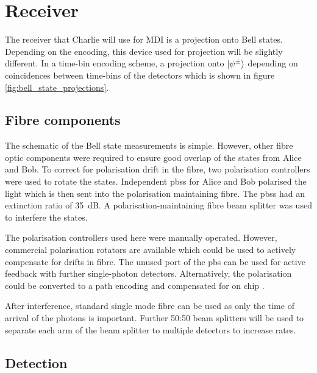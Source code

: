 \section{Receiver}

The receiver that Charlie will use for \ac{MDI} is a projection onto Bell states. Depending on the encoding, this device used for projection will be slightly different. In a time-bin encoding scheme, a projection onto $\ket{\psi^\pm}$ depending on coincidences between time-bins of the detectors which is shown in figure \ref{fig:bell_state_projections}.

\subsection{Fibre components}

The schematic of the Bell state measurements is simple. However, other fibre optic components were required to ensure good overlap of the states from Alice and Bob. To correct for polarisation drift in the fibre, two polarisation controllers were used to rotate the states. Independent \acp{pbs} for Alice and Bob polarised the light which is then sent into the polarisation maintaining fibre. The \acp{pbs} had an extinction ratio of \SI{35}{dB}. A polarisation-maintaining fibre beam splitter was used to interfere the states.

The polarisation controllers used here were manually operated. However, commercial polarisation rotators are available which could be used to actively compensate for drifts in fibre. The unused port of the \ac{pbs} can be used for active feedback with further single-photon detectors. Alternatively, the polarisation could be converted to a path encoding and compensated for on chip \cite{wang2016}.

After interference, standard single mode fibre can be used as only the time of arrival of the photons is important. Further {50:50} beam splitters will be used to separate each arm of the beam splitter to multiple detectors to increase rates. 



\subsection{Detection}

